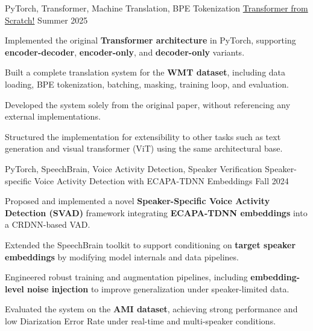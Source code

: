 

\begin{cventries}

\cventry
  {PyTorch, Transformer, Machine Translation, BPE Tokenization} %
  {\href{https://github.com/radinshayanfar/transformer}{Transformer from Scratch!}} %
  {} %
  {Summer 2025} %
  {
    \begin{cvitems}
      \item {Implemented the original \textbf{Transformer architecture} in PyTorch, supporting \textbf{encoder-decoder}, \textbf{encoder-only}, and \textbf{decoder-only} variants.}
      \item {Built a complete translation system for the \textbf{WMT dataset}, including data loading, BPE tokenization, batching, masking, training loop, and evaluation.}
      \item {Developed the system solely from the original paper, without referencing any external implementations.}
      \item {Structured the implementation for extensibility to other tasks such as text generation and visual transformer (ViT) using the same architectural base.}
    \end{cvitems}
  }

\cventry
    {PyTorch, SpeechBrain, Voice Activity Detection, Speaker Verification} %
    {Speaker-specific Voice Activity Detection with ECAPA-TDNN Embeddings} %
    {} %
    {Fall 2024} %
    {
      \begin{cvitems}
        \item {Proposed and implemented a novel \textbf{Speaker-Specific Voice Activity Detection (SVAD)} framework integrating \textbf{ECAPA-TDNN embeddings} into a CRDNN-based VAD.}
        \item {Extended the SpeechBrain toolkit to support conditioning on \textbf{target speaker embeddings} by modifying model internals and data pipelines.}
        \item {Engineered robust training and augmentation pipelines, including \textbf{embedding-level noise injection} to improve generalization under speaker-limited data.}
        \item {Evaluated the system on the \textbf{AMI dataset}, achieving strong performance and low Diarization Error Rate under real-time and multi-speaker conditions.}
      \end{cvitems}
    }
    

\end{cventries}
